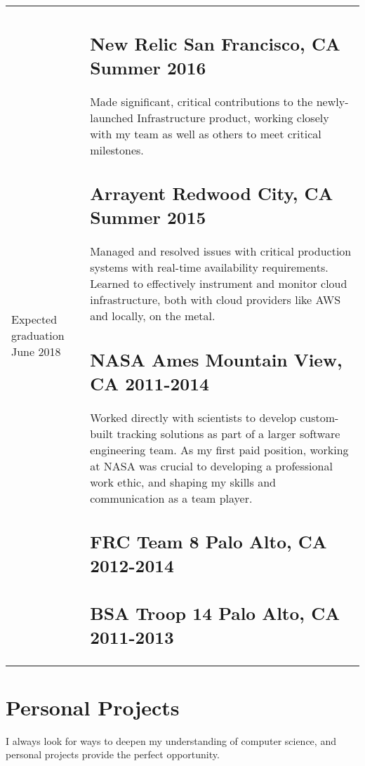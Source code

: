 \documentclass[letterpaper]{article}
\newcommand{\subtitle}{\normalfont\sffamily\color{black}\large}
\newlength{\rightcolwidth}
\newlength{\leftcolwidth}
\begin{document}
\begin{tabular}{@{}p{\leftcolwidth} p{\rightcolwidth}}
Expected graduation June 2018

&

\subsection*{New Relic \subtitle San Francisco, CA Summer 2016}

Made significant, critical contributions to the newly-launched Infrastructure
product, working closely with my team as well as others to meet critical milestones.

\subsection*{Arrayent \subtitle Redwood City, CA Summer 2015}

Managed and resolved issues with critical production systems with real-time
availability requirements. Learned to effectively instrument and monitor cloud
infrastructure, both with cloud providers like AWS and locally, on the metal.

\subsection*{NASA Ames \subtitle Mountain View, CA 2011-2014}

Worked directly with scientists to develop custom-built tracking solutions as
part of a larger software engineering team. As my first paid position, working
at NASA was crucial to developing a professional work ethic, and shaping my
skills and communication as a team player.

\subsection*{FRC Team 8  \subtitle Palo Alto, CA 2012-2014}

\subsection*{BSA Troop 14 \subtitle Palo Alto, CA 2011-2013}

\end{tabular}

\section*{Personal Projects}

I always look for ways to deepen my understanding of computer science, and
personal projects provide the perfect opportunity.
\end{document}
